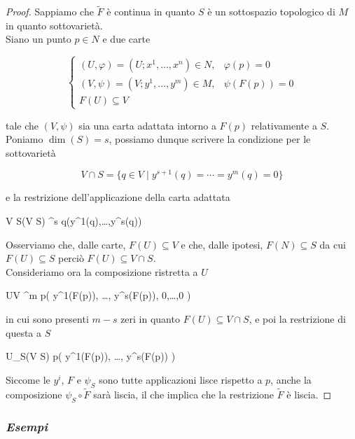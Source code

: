\begin{proof}
	Sappiamo che $ \tilde{F} $ è continua in quanto $ S $ è un sottospazio topologico di $ M $ in quanto sottovarietà. \\
	Siano un punto $ p \in N $ e due carte
	
	\begin{equation}
		\begin{cases}
			(U,\varphi) = (U; x^{1},\dots,x^{n}) \in N, & \varphi(p) = 0 \\
			(V,\psi) = (V; y^{1},\dots,y^{m}) \in M, & \psi(F(p)) = 0 \\
			F(U) \subseteq V
		\end{cases}
	\end{equation}
	
	tale che $ (V,\psi) $ sia una carta adattata intorno a $ F(p) $ relativamente a $ S $. \\
	Poniamo $ \dim(S) = s $, possiamo dunque scrivere la condizione per le sottovarietà
	
	\begin{equation}
		V \cap S = \{ q \in V \mid y^{s+1}(q) = \cdots = y^{m}(q) = 0 \}
	\end{equation}
	
	e la restrizione dell'applicazione della carta adattata
	
		{V \cap S}{\psi(V \cap S) \subset \R^{s}}
		{q}{(y^{1}(q),\dots,y^{s}(q))}

	Osserviamo che, dalle carte, $ F(U) \subseteq V $ e che, dalle ipotesi, $ F(N) \subseteq S $ da cui $ F(U) \subseteq S $ perciò $ F(U) \subseteq V \cap S $. \\
	Consideriamo ora la composizione ristretta a $ U $
	
		{U}{V \subset \R^{m}}
		{p}{\left( y^{1}(F(p)), \dots, y^{s}(F(p)), 0,\dots,0 \right)}

	in cui sono presenti $ m - s $ zeri in quanto $ F(U) \subseteq V \cap S $, e poi la restrizione di questa a $ S $
	
		{U}{\psi_{S}(V \cap S)}
		{p}{\left( y^{1}(F(p)), \dots, y^{s}(F(p)) \right)}

	Siccome le $ y^{i} $, $ F $ e $ \psi_{S} $ sono tutte applicazioni lisce rispetto a $ p $, anche la composizione $ \psi_{S} \circ \tilde{F} $ sarà liscia, il che implica che la restrizione $ \tilde{F} $ è liscia.
\end{proof}

\subsubsection{\textit{Esempi}}


